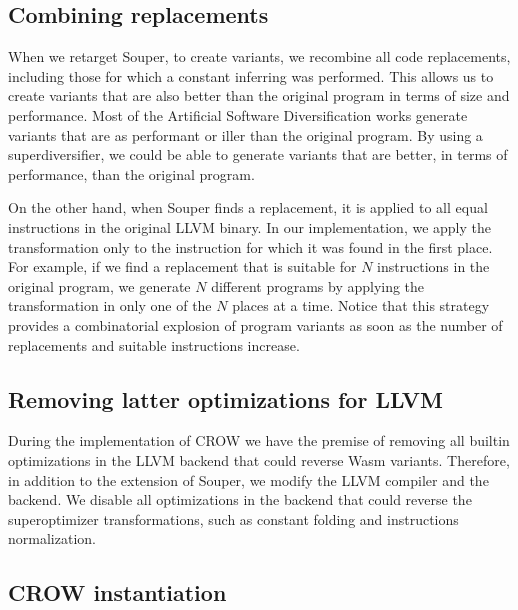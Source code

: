 \subsection*{Combining replacements}

When we retarget Souper, to create variants, we recombine all code replacements, including those for which a constant inferring was performed.
This allows us to create variants that are also better than the original program in terms of size and performance. Most of the Artificial Software Diversification works generate variants that are as performant or iller than the original program. By using a superdiversifier, we could be able to generate variants that are better, in terms of performance, than the original program.

On the other hand, when Souper finds a replacement, it is applied to all equal instructions in the original LLVM binary. In our implementation, we apply the transformation only to the instruction for which it was found in the first place. For example, if we find a replacement that is suitable for $N$ instructions in the original program, we generate $N$ different programs by applying the transformation in only one of the $N$ places at a time. Notice that this strategy provides a combinatorial explosion of program variants as soon as the number of replacements and suitable instructions increase.

\subsection*{Removing latter optimizations for LLVM}

During the implementation of CROW we have the premise of removing all builtin optimizations in the LLVM backend that could reverse Wasm variants.
Therefore, in addition to the extension of Souper, we modify the LLVM compiler and the \wasm backend.
We disable all optimizations in the \wasm backend that could reverse the superoptimizer transformations, such as constant folding and instructions normalization.



\subsection{CROW instantiation}

